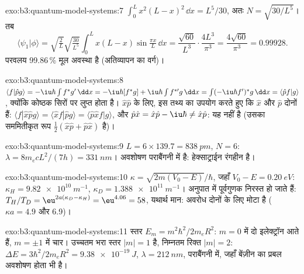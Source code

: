 \begin{solution}{exo:b3:quantum-model-systems:7}
$\int_0^Lx^2(L - x)^2\,\dd x = L^5/30$, अतः $N = \sqrt{30/L^5}$। तब
\[
\langle\psi_1|\phi\rangle = \sqrt{\tfrac2L}\sqrt{\tfrac{30}{L^5}}\int_0^Lx(L -
x)\sin\tfrac{\pi x}{L}\,\dd x = \frac{\sqrt{60}}{L^3}\cdot\frac{4L^3}{\pi^3} =
\frac{4\sqrt{60}}{\pi^3} = 0.99928 .
\]
परवलय 99.86\,\% मूल अवस्था है (अतिव्यापन का वर्ग)।
\end{solution}

\begin{solution}{exo:b3:quantum-model-systems:8}
$\langle f|\hat pg\rangle = -\iu\hbar\int f^*g'\,\dd x = -\iu\hbar[f^*g] +
\iu\hbar\int f^{*\prime}g\,\dd x = \int(-\iu\hbar f')^*g\,\dd x = \langle\hat
pf|g\rangle$, क्योंकि कोष्ठक सिरों पर लुप्त होता है। $\hat x\hat p$ के लिए, इस तथ्य का उपयोग करते हुए कि $\hat x$ और $\hat p$ दोनों  हैं:
$\langle f|\hat x\hat pg\rangle = \langle\hat xf|\hat pg\rangle = \langle\hat p\hat
xf|g\rangle$, और $\hat p\hat x = \hat x\hat p - \iu\hbar \ne \hat x\hat p$: यह
 नहीं है (उसका सममितीकृत रूप $\frac12(\hat x\hat p + \hat p\hat x)$  है)।
\end{solution}

\begin{solution}{exo:b3:quantum-model-systems:9}
$L = 6 \times 139.7 = \qty{838}{pm}$, $N = 6$: $\lambda = 8m_ecL^2/(7h) =
\qty{331}{nm}$। अवशोषण पराबैंगनी में है: हेक्साट्राईन
रंगहीन है।
\end{solution}

\begin{solution}{exo:b3:quantum-model-systems:10}
$\kappa = \sqrt{2m(V_0 - E)}/\hbar$, जहाँ $V_0 - E = \qty{0.20}{eV}$:
$\kappa_H = \qty{9.82e10}{m^{-1}}$, $\kappa_D = \qty{1.388e11}{m^{-1}}$। अनुपात में
पूर्वगुणक निरस्त हो जाते हैं: $T_H/T_D = \eu^{2a(\kappa_D - \kappa_H)} =
\eu^{4.06} = 58$, यथार्थ मान: अवरोध दोनों के लिए मोटा है
($\kappa a = 4.9$ और 6.9)।
\end{solution}

\begin{solution}{exo:b3:quantum-model-systems:11}
स्तर $E_m = m^2\hbar^2/2m_eR^2$: $m = 0$ में दो इलेक्ट्रॉन आते हैं, $m = \pm1$ में
चार। उच्चतम भरा स्तर $|m| = 1$ है, निम्नतम रिक्त $|m| = 2$: $\Delta E =
3\hbar^2/2m_eR^2 = \qty{9.38e-19}{J}$, $\lambda = \qty{212}{nm}$,
पराबैंगनी में, जहाँ बेंज़ीन का प्रबल अवशोषण होता भी है।
\end{solution}


